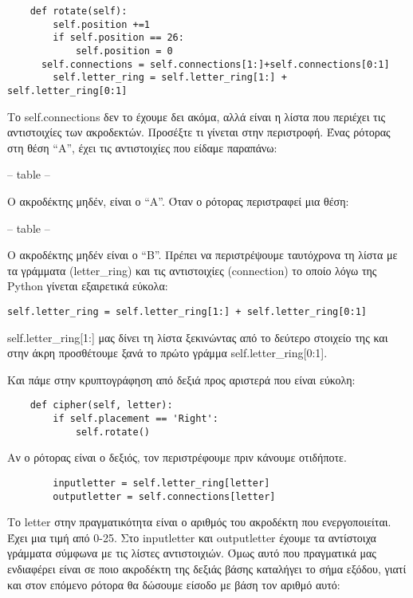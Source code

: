 \documentclass[a4paper,twoside,12pt]{article}
\begin{document}
\begin{verbatim}
    def rotate(self):
        self.position +=1
        if self.position == 26:
            self.position = 0
	  self.connections = self.connections[1:]+self.connections[0:1]
        self.letter_ring = self.letter_ring[1:] + self.letter_ring[0:1]
\end{verbatim}

Το self.connections δεν το έχουμε δει ακόμα, αλλά είναι η λίστα που περιέχει τις αντιστοιχίες των ακροδεκτών. Προσέξτε τι γίνεται στην περιστροφή. Ένας ρότορας στη θέση “Α”, έχει τις αντιστοιχίες που είδαμε παραπάνω:

-- table --

Ο ακροδέκτης μηδέν, είναι ο “Α”. Όταν ο ρότορας περιστραφεί μια θέση:	

-- table --

Ο ακροδέκτης μηδέν είναι ο “Β”. Πρέπει να περιστρέψουμε ταυτόχρονα  τη λίστα με τα γράμματα (letter\_ring) και τις αντιστοιχίες (connection) το οποίο λόγω της Python γίνεται εξαιρετικά εύκολα:

\begin{verbatim}
self.letter_ring = self.letter_ring[1:] + self.letter_ring[0:1]
\end{verbatim}

self.letter\_ring[1:] μας δίνει τη λίστα ξεκινώντας από το δεύτερο στοιχείο της και στην άκρη προσθέτουμε ξανά το πρώτο γράμμα self.letter\_ring[0:1].

Και πάμε στην κρυπτογράφηση από δεξιά προς αριστερά που είναι εύκολη:

\begin{verbatim}
    def cipher(self, letter):
        if self.placement == 'Right':
            self.rotate()
\end{verbatim}

Αν ο ρότορας είναι ο δεξιός, τον περιστρέφουμε πριν κάνουμε οτιδήποτε.

\begin{verbatim}
        inputletter = self.letter_ring[letter]
        outputletter = self.connections[letter]
\end{verbatim}

Το letter στην πραγματικότητα είναι ο αριθμός του ακροδέκτη που ενεργοποιείται. Έχει μια τιμή από 0-25. Στο inputletter και outputletter έχουμε τα αντίστοιχα γράμματα σύμφωνα με τις λίστες αντιστοιχιών. Όμως αυτό που πραγματικά μας ενδιαφέρει είναι σε ποιο ακροδέκτη της δεξιάς βάσης καταλήγει το σήμα εξόδου, γιατί και στον επόμενο ρότορα θα δώσουμε είσοδο με βάση τον αριθμό αυτό:
\end{document}

